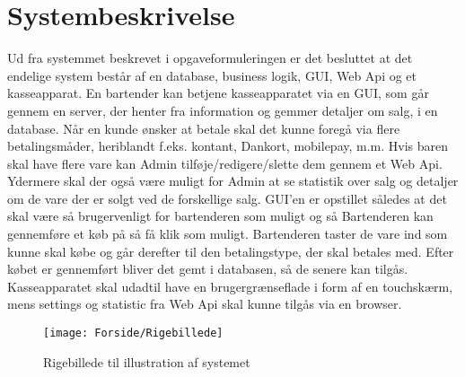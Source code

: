 \chapter{Systembeskrivelse}
Ud fra systemmet beskrevet i opgaveformuleringen er det besluttet at det endelige system består af en database, business logik, GUI, Web Api og et kasseapparat. 
\newline
\newline
En bartender kan betjene kasseapparatet via en GUI, som går gennem en server, der henter fra information og gemmer detaljer om salg, i en database.
Når en kunde ønsker at betale skal det kunne foregå via flere betalingsmåder, heriblandt f.eks. kontant, Dankort, mobilepay, m.m.
\newline
\newline
Hvis baren skal have flere vare kan Admin tilføje/redigere/slette dem gennem et Web Api. Ydermere skal der også være muligt for Admin at se statistik over salg og detaljer om de vare der er solgt ved de forskellige salg. 
\newline
\newline
GUI'en er opstillet således at det skal være så brugervenligt for bartenderen som muligt og så Bartenderen kan gennemføre et køb på så få klik som muligt. Bartenderen taster de vare ind som kunne skal købe og går derefter til den betalingstype, der skal betales med. Efter købet er gennemført bliver det gemt i databasen, så de senere kan tilgås. 
\newline
\newline
Kasseapparatet skal udadtil have en brugergrænseflade i form af en touchskærm, mens settings og statistic fra Web Api skal kunne tilgås via en browser. 
                  
\begin{figure}[h]
    \centering
    \texttt{[image: Forside/Rigebillede]}
    \caption{Rigebillede til illustration af systemet}
    \label{fig:rig_billede}
\end{figure} 

